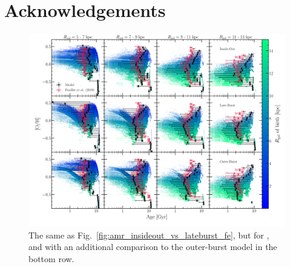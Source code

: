\documentclass[draft2.tex]{subfiles}
\begin{document}
 

\section{Acknowledgements} 
\label{sec:acknowledgements} 

\begin{figure} 
\includegraphics[scale = 0.32]{age_oh_comparison.pdf} 
\caption{The same as Fig.~\ref{fig:amr_insideout_vs_lateburst_fe}, but for 
\oh, and with an additional comparison to the outer-burst model in the 
bottom row.} 
\label{fig:age_oh_comparison} 
\end{figure} 
\end{document}
